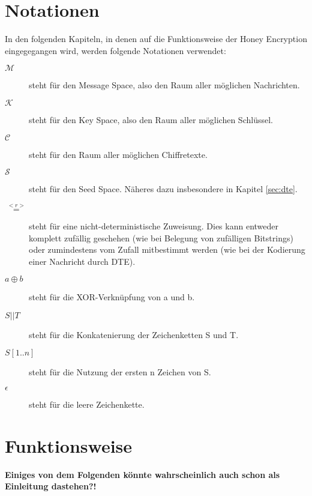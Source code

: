 \section{Notationen}

In den folgenden Kapiteln, in denen auf die Funktionsweise der Honey Encryption eingegegangen wird, werden folgende Notationen verwendet:

\begin{description}

\item[\(\mathcal{M}\)] steht für den Message Space, also den Raum aller möglichen Nachrichten.

\item[\(\mathcal{K}\)] steht für den Key Space, also den Raum aller möglichen Schlüssel.

\item[\(\mathcal{C}\)] steht für den Raum aller möglichen Chiffretexte.

\item[\(\mathcal{S}\)] steht für den Seed Space. Näheres dazu insbesondere in Kapitel \ref{sec:dte}.

\item[\(\overset{<r>}{=}\)] steht für eine nicht-deterministische Zuweisung. Dies kann entweder komplett zufällig geschehen (wie bei Belegung von zufälligen Bitstrings) oder zumindestens vom Zufall mitbestimmt werden (wie bei der Kodierung einer Nachricht durch DTE).

\item[\(a \oplus b\)] steht für die XOR-Verknüpfung von a und b.

\item[\(S || T\)] steht für die Konkatenierung der Zeichenketten S und T.

\item[\(S{[1..n]}\)] steht für die Nutzung der ersten n Zeichen von S.

\item[\(\epsilon\)] steht für die leere Zeichenkette.

\end{description}

\newpage

\section{Funktionsweise}
\label{sec:funktionsweise}

\textbf{Einiges von dem Folgenden könnte wahrscheinlich auch schon als Einleitung dastehen?!}

